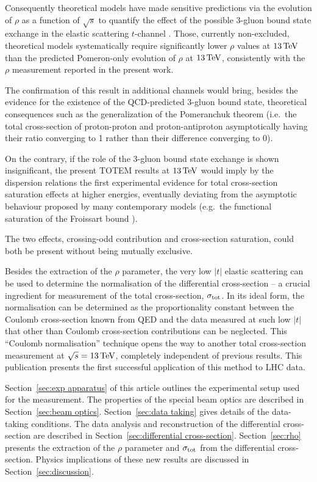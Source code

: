 Consequently theoretical models have made sensitive predictions via the evolution of $\rho$ as a function of $\sqrt s$ to quantify the effect of the possible 3-gluon bound state exchange in the elastic scattering $t$-channel \cite{nicolescu-2007,durham-2018}. Those, currently non-excluded, theoretical models systematically require significantly lower $\rho$ values at $13\,{\rm TeV}$ than the predicted Pomeron-only evolution of $\rho$ at $13\,{\rm TeV}$, consistently with the $\rho$ measurement reported in the present work.

The confirmation of this result in additional channels would bring, besides the evidence for the existence of the QCD-predicted 3-gluon bound state, theoretical consequences such as the generalization of the Pomeranchuk theorem (i.e.~the total cross-section of proton-proton and proton-antiproton asymptotically having their ratio converging to 1 rather than their difference converging to 0).

On the contrary, if the role of the 3-gluon bound state exchange is shown insignificant, the present TOTEM results at $13\,{\rm TeV}$ would imply by the dispersion relations the first experimental evidence for total cross-section saturation effects at higher energies, eventually deviating from the asymptotic behaviour proposed by many contemporary models (e.g.~the functional saturation of the Froissart bound \cite{froissart-1961}).

The two effects, crossing-odd contribution and cross-section saturation, could both be present without being mutually exclusive.

Besides the extraction of the $\rho$ parameter, the very low $|t|$ elastic scattering can be used to determine the normalisation of the differential cross-section -- a crucial ingredient for measurement of the total cross-section, $\sigma_{\rm tot}$. In its ideal form, the normalisation can be determined as the proportionality constant between the Coulomb cross-section known from QED and the data measured at such low $|t|$ that other than Coulomb cross-section contributions can be neglected. This ``Coulomb normalisation'' technique opens the way to another total cross-section measurement at $\sqrt s = 13\,{\rm TeV}$, completely independent of previous results. This publication presents the first successful application of this method to LHC data.

Section~\ref{sec:exp apparatus} of this article outlines the experimental setup used for the measurement. The properties of the special beam optics are described in Section~\ref{sec:beam optics}. Section~\ref{sec:data taking} gives details of the data-taking conditions. The data analysis and reconstruction of the differential cross-section are described in Section~\ref{sec:differential cross-section}. Section~\ref{sec:rho} presents the extraction of the $\rho$ parameter and $\sigma_{\rm tot}$ from the differential cross-section. Physics implications of these new results are discussed in Section~\ref{sec:discussion}.
